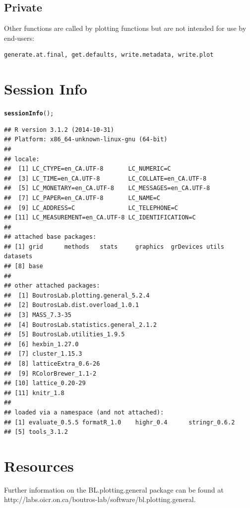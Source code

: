 \documentclass[letterpaper]{report}\usepackage[]{graphicx}\usepackage[]{color}
\makeatletter
\newcommand{\hlstd}[1]{\textcolor[rgb]{0.345,0.345,0.345}{#1}}%
\newcommand{\hlkwd}[1]{\textcolor[rgb]{0.737,0.353,0.396}{\textbf{#1}}}%
\newenvironment{kframe}{%
 \def\at@end@of@kframe{}%
 \ifinner\ifhmode%
  \def\at@end@of@kframe{\end{minipage}}%
  \begin{minipage}{\columnwidth}%
 \fi\fi%
 \def\FrameCommand##1{\hskip\@totalleftmargin \hskip-\fboxsep
 \colorbox{shadecolor}{##1}\hskip-\fboxsep
     \hskip-\linewidth \hskip-\@totalleftmargin \hskip\columnwidth}%
 \MakeFramed {\advance\hsize-\width
   \@totalleftmargin\z@ \linewidth\hsize
   \@setminipage}}%
 {\par\unskip\endMakeFramed%
 \at@end@of@kframe}
\newenvironment{knitrout}{}{} %
\makeatother
\begin{document}
\subsection{Private}
Other functions are called by plotting functions but are not intended for use by end-users: 
\begin{verbatim}
generate.at.final, get.defaults, write.metadata, write.plot
\end{verbatim}



\section{Session Info}
\begin{knitrout}
\color{fgcolor}\begin{kframe}
\begin{alltt}
\hlkwd{sessionInfo}\hlstd{();}
\end{alltt}
\begin{verbatim}
## R version 3.1.2 (2014-10-31)
## Platform: x86_64-unknown-linux-gnu (64-bit)
## 
## locale:
##  [1] LC_CTYPE=en_CA.UTF-8       LC_NUMERIC=C              
##  [3] LC_TIME=en_CA.UTF-8        LC_COLLATE=en_CA.UTF-8    
##  [5] LC_MONETARY=en_CA.UTF-8    LC_MESSAGES=en_CA.UTF-8   
##  [7] LC_PAPER=en_CA.UTF-8       LC_NAME=C                 
##  [9] LC_ADDRESS=C               LC_TELEPHONE=C            
## [11] LC_MEASUREMENT=en_CA.UTF-8 LC_IDENTIFICATION=C       
## 
## attached base packages:
## [1] grid      methods   stats     graphics  grDevices utils     datasets 
## [8] base     
## 
## other attached packages:
##  [1] BoutrosLab.plotting.general_5.2.4  
##  [2] BoutrosLab.dist.overload_1.0.1     
##  [3] MASS_7.3-35                        
##  [4] BoutrosLab.statistics.general_2.1.2
##  [5] BoutrosLab.utilities_1.9.5         
##  [6] hexbin_1.27.0                      
##  [7] cluster_1.15.3                     
##  [8] latticeExtra_0.6-26                
##  [9] RColorBrewer_1.1-2                 
## [10] lattice_0.20-29                    
## [11] knitr_1.8                          
## 
## loaded via a namespace (and not attached):
## [1] evaluate_0.5.5 formatR_1.0    highr_0.4      stringr_0.6.2 
## [5] tools_3.1.2
\end{verbatim}
\end{kframe}
\end{knitrout}

\section{Resources}
Further information on the BL.plotting.general package can be found at  http://labs.oicr.on.ca/boutros-lab/software/bl.plotting.general.
\end{document}
